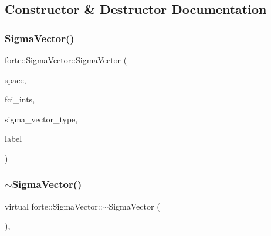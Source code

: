 \subsection{Constructor \& Destructor Documentation}
\mbox{\label{classforte_1_1_sigma_vector_aea65e2b6b76bd9b79c0c300d44eed183}} 
\subsubsection{\texorpdfstring{Sigma\+Vector()}{SigmaVector()}}
{\footnotesize\ttfamily forte\+::\+Sigma\+Vector\+::\+Sigma\+Vector (\begin{DoxyParamCaption}\item[{const \mbox{\hyperlink{classforte_1_1_determinant_hash_vec}{Determinant\+Hash\+Vec}} \&}]{space,  }\item[{std\+::shared\+\_\+ptr$<$ \mbox{\hyperlink{classforte_1_1_active_space_integrals}{Active\+Space\+Integrals}} $>$}]{fci\+\_\+ints,  }\item[{\mbox{\hyperlink{namespaceforte_a94410e08f0cf9a0cfc5e53c70b6bf485}{Sigma\+Vector\+Type}}}]{sigma\+\_\+vector\+\_\+type,  }\item[{std\+::string}]{label }\end{DoxyParamCaption})\hspace{0.3cm}{\ttfamily [inline]}}

\mbox{\label{classforte_1_1_sigma_vector_a81f8499f67f12c8c51dcfd60c13faee6}} 
\subsubsection{\texorpdfstring{$\sim$\+Sigma\+Vector()}{~SigmaVector()}}
{\footnotesize\ttfamily virtual forte\+::\+Sigma\+Vector\+::$\sim$\+Sigma\+Vector (\begin{DoxyParamCaption}{ }\end{DoxyParamCaption})\hspace{0.3cm}{\ttfamily [virtual]}, {\ttfamily [default]}}



